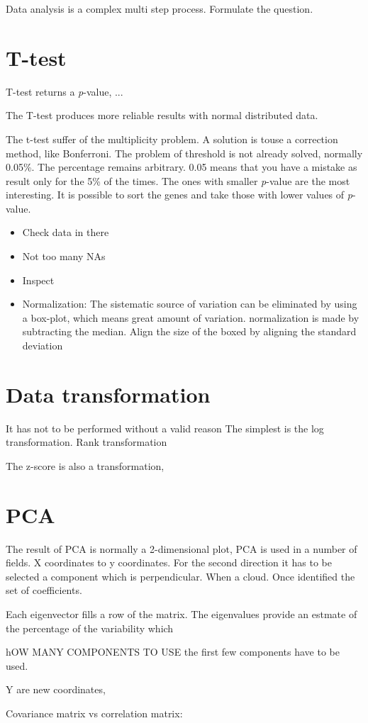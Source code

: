 Data analysis is a complex multi step process. Formulate the question.

\section{T-test}
T-test returns a \textit{p}-value,  ... %

The T-test produces more reliable results with normal distributed data.

The t-test suffer of the multiplicity problem. A solution is touse a correction method, like Bonferroni. The problem of threshold is not already solved, normally 0.05\%. The percentage remains arbitrary. 0.05 means that you have a mistake as result only for the 5\% of the times. 
The ones with smaller \textit{p}-value are the most interesting. It is possible to sort the genes and take those with lower values of \textit{p}-value.


\begin{itemize}
	\item Check data in there 
	\item Not too many NAs
	\item Inspect
	\item Normalization: The sistematic source of variation can be eliminated by using a box-plot, which means great amount of variation. normalization is made by subtracting the median.
Align the size of the boxed by aligning the standard deviation
\end{itemize}


\section{Data transformation}
It has not to be performed without a valid reason
The simplest is the log transformation.
Rank transformation 

The z-score is also a transformation, 

\section{PCA} %
The result of PCA is normally a 2-dimensional plot, PCA is used in a number of fields. X coordinates to y coordinates. 
For the second direction it has to be selected  a component which is perpendicular. When a cloud. Once identified the set of coefficients.

Each eigenvector fills a row of the matrix. The eigenvalues provide an estmate of the percentage of the variability which 

hOW MANY COMPONENTS TO USE
the first few components have to be used. 

Y are new coordinates, 








Covariance matrix vs correlation matrix: 




